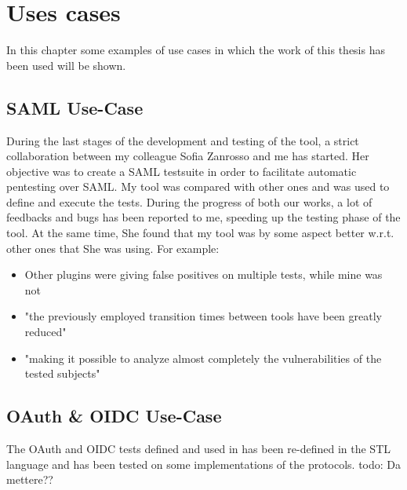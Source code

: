 \chapter{Uses cases}
In this chapter some examples of use cases in which the work of this thesis has been used will be shown.

\section{SAML Use-Case}
During the last stages of the development and testing of the tool, a strict collaboration between my colleague Sofia Zanrosso and me has started. Her objective was to create a SAML testsuite in order to facilitate automatic pentesting over SAML. My tool was compared with other ones and was used to define and execute the tests. During the progress of both our works, a lot of feedbacks and bugs has been reported to me, speeding up the testing phase of the tool. At the same time, She found that my tool was by some aspect better w.r.t. other ones that She was using. For example:
\begin{itemize}
    \item Other plugins were giving false positives on multiple tests, while mine was not
    \item "the previously employed transition times between tools have been greatly reduced"
    \item "making it possible to analyze almost completely the vulnerabilities of the tested subjects"
\end{itemize}


\section{OAuth \& OIDC Use-Case}
The \Gls{OAuth} and \Gls{OIDC} tests defined and used in \cite{claudio_grisenti}\cite{wendy_barreto} has been re-defined in the STL language and has been tested on some implementations of the protocols.
todo: Da mettere??




